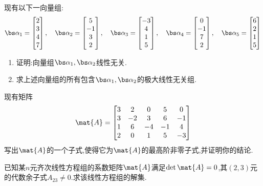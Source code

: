 \documentclass{ctexart}
\begin{document}
\begin{homework}[4]
    现有以下一向量组:
    \[\bs\alpha_1=\begin{bmatrix}
        2\\3\\4\\7
    \end{bmatrix},\quad\bs\alpha_2=\begin{bmatrix}
        5\\-1\\3\\2
    \end{bmatrix},\quad\bs\alpha_3=\begin{bmatrix}
        -3\\4\\1\\5
    \end{bmatrix},\quad\bs\alpha_4=\begin{bmatrix}
        0\\-1\\7\\2
    \end{bmatrix},\quad\bs\alpha_5=\begin{bmatrix}
        6\\2\\1\\5
    \end{bmatrix}\]
    \begin{enumerate}[label=\tbf{(\arabic*)},topsep=0pt,parsep=0pt,itemsep=0pt,partopsep=0pt]
        \item 证明:向量组$\bs\alpha_1,\bs\alpha_2$线性无关.
        \item 求上述向量组的所有包含$\bs\alpha_1,\bs\alpha_2$的极大线性无关组.
    \end{enumerate}
\end{homework}
\begin{homework}[5]
    现有矩阵
    \[\mat{A}=\begin{bmatrix}
        3&2&0&5&0\\
        3&-2&3&6&-1\\
        1&6&-4&-1&4\\
        2&0&1&5&-3
    \end{bmatrix}\]
    写出$\mat{A}$的一个子式,使得它为$\mat{A}$的最高阶非零子式,并证明你的结论.
\end{homework}
\begin{homework}[6]
    已知某$n$元齐次线性方程组的系数矩阵$\mat{A}$满足$\det\mat{A}=0$,其$(2,3)$元的代数余子式$A_{23}\neq0$.求该线性方程组的解集.
\end{homework}
\end{document}
